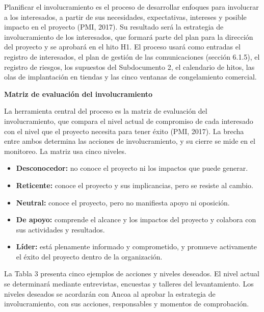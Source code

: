 \documentclass[11pt]{article}
\begin{document}
Planificar el involucramiento es el proceso de desarrollar enfoques para involucrar a los interesados, a partir de sus necesidades, expectativas, intereses y posible impacto en el proyecto (PMI, 2017). Su resultado será la estrategia de involucramiento de los interesados, que formará parte del plan para la dirección del proyecto y se aprobará en el hito H1. El proceso usará como entradas el registro de interesados, el plan de gestión de las comunicaciones (sección 6.1.5), el registro de riesgos, los supuestos del Subdocumento 2, el calendario de hitos, las olas de implantación en tiendas y las cinco ventanas de congelamiento comercial.

\textbf{Matriz de evaluación del involucramiento}

La herramienta central del proceso es la matriz de evaluación del
involucramiento, que compara el nivel actual de compromiso de cada
interesado con el nivel que el proyecto necesita para tener éxito (PMI,
2017). La brecha entre ambos determina las acciones de involucramiento,
y su cierre se mide en el monitoreo. La matriz usa cinco niveles.

\begin{itemize}
\item
  \textbf{Desconocedor:} no conoce el proyecto ni los impactos que puede
  generar.
\item
  \textbf{Reticente:} conoce el proyecto y sus implicancias, pero se
  resiste al cambio.
\item
  \textbf{Neutral:} conoce el proyecto, pero no manifiesta apoyo ni
  oposición.
\item
  \textbf{De apoyo:} comprende el alcance y los impactos del proyecto y
  colabora con sus actividades y resultados.
\item
  \textbf{Líder:} está plenamente informado y comprometido, y promueve
  activamente el éxito del proyecto dentro de la organización.
\end{itemize}

La Tabla 3 presenta cinco ejemplos de acciones y niveles deseados. El
nivel actual se determinará mediante entrevistas, encuestas y talleres
del levantamiento. Los niveles deseados se acordarán con Ancoa al
aprobar la estrategia de involucramiento, con sus acciones, responsables
y momentos de comprobación.
\end{document}
